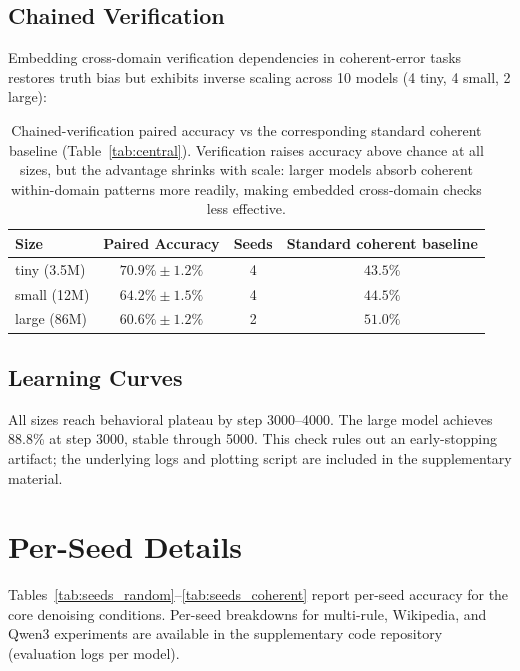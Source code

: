 \documentclass{article}
\begin{document}
\subsection{Chained Verification}
\label{app:chained}

Embedding cross-domain verification dependencies in coherent-error tasks restores truth bias but exhibits inverse scaling across 10 models (4 tiny, 4 small, 2 large):

\begin{table}[h]
\centering
\small
\begin{tabular}{lccc}
\toprule
Size & Paired Accuracy & Seeds & Standard coherent baseline \\
\midrule
tiny (3.5M)  & $70.9\% \pm 1.2\%$ & 4 & $43.5\%$ \\
small (12M)  & $64.2\% \pm 1.5\%$ & 4 & $44.5\%$ \\
large (86M)  & $60.6\% \pm 1.2\%$ & 2 & $51.0\%$ \\
\bottomrule
\end{tabular}
\caption{Chained-verification paired accuracy vs the corresponding standard coherent baseline (Table~\ref{tab:central}). Verification raises accuracy above chance at all sizes, but the advantage shrinks with scale: larger models absorb coherent within-domain patterns more readily, making embedded cross-domain checks less effective.}
\label{tab:chained}
\end{table}

\subsection{Learning Curves}

All sizes reach behavioral plateau by step 3000--4000. The large model achieves 88.8\% at step 3000, stable through 5000. This check rules out an early-stopping artifact; the underlying logs and plotting script are included in the supplementary material.

\section{Per-Seed Details}
\label{app:seeds}

Tables~\ref{tab:seeds_random}--\ref{tab:seeds_coherent} report per-seed accuracy for the core denoising conditions. Per-seed breakdowns for multi-rule, Wikipedia, and Qwen3 experiments are available in the supplementary code repository (evaluation logs per model).
\end{document}

